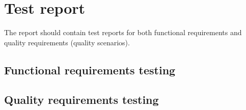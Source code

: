 \section{Test report}

The report should contain test reports for both functional requirements and quality requirements (quality scenarios).

\subsection{Functional requirements testing}

\subsection{Quality requirements testing}






